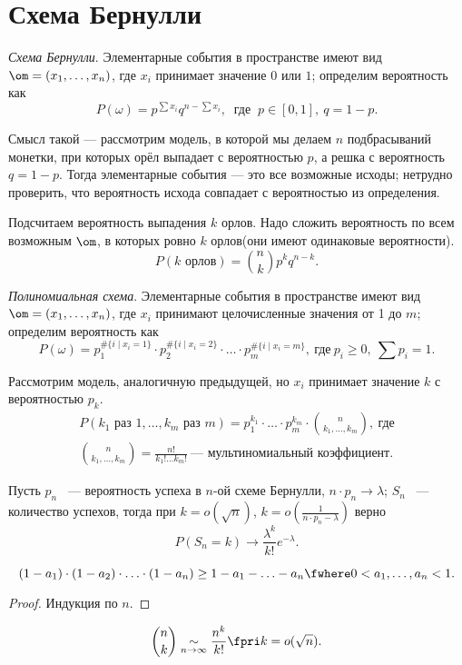 \section{Схема Бернулли}

 \begin{definition} \textit{Схема Бернулли}. Элементарные события в пространстве имеют вид $\om = (x_1, \ldots, x_n)$, где $x_i$ принимает значение $0$ или $1$; определим вероятность как
 $$P(\omega) = p^{\sum x_i}q^{n - \sum x_i},\ \text{ где } \ p \in [0, 1], \ q = 1-p.$$ 
 \end{definition}

Смысл такой --- рассмотрим модель, в которой мы делаем $n$ подбрасываний монетки, при которых орёл выпадает с вероятностью $p$, а решка с вероятность $q=1-p$. Тогда элементарные события --- это все возможные исходы; нетрудно проверить, что вероятность исхода совпадает с вероятностью из определения. 

Подсчитаем вероятность выпадения $k$ орлов. Надо сложить вероятность по всем возможным $\om$, в которых ровно $k$ орлов(они имеют одинаковые вероятности).
$$P(k \text{ орлов}) = \binom{n}{k}p^kq^{n - k}.$$

 \begin{definition}\textit{Полиномиальная схема}.
Элементарные события в пространстве имеют вид $\om = (x_1, \ldots, x_n)$, где $x_i$ принимают целочисленные значения от 1 до $m$; определим вероятность как
$$P(\omega) = p_1^{\#\{i\mid x_i = 1\}}\cdot p_2^{\#\{i\mid x_i = 2\}}\cdot\ldots\cdot p_m^{\#\{i\mid x_i = m\}},\ \text{где} \ p_i \ge 0, \ \sum p_i = 1.$$
 \end{definition}
Рассмотрим модель, аналогичную предыдущей, но $x_i$ принимает значение $k$ с вероятностью $p_k$.
\begin{gather*}
    P(k_1 \text{ раз } 1, \ldots, k_m \text{ раз } m) = p_1^{k_1}\cdot\ldots\cdot p_m^{k_m}\cdot \binom{n}{k_1,\ldots, k_m}, \ \text{где} \\ \binom{n}{k_1,\ldots, k_m} = \frac{n!}{k_1!\ldots k_m!} \ \text{--- мультиномиальный коэффициент.}
\end{gather*}

 \begin{theorem}[Пуассона]\label{th:puas}
     Пусть $p_n$ ~--- вероятность успеха в $n$-ой схеме Бернулли, $n\cdot p_n \rightarrow \lambda$;
     $S_n$ ~--- количество успехов, тогда при $k = o(\sqrt{n})$, $k = o(\frac{1}{n\cdot p_n - \lambda})$ верно
     $$P(S_n = k) \rightarrow \frac{\lambda^k}{k!}e^{-\lambda}.$$
 \end{theorem}
 \begin{lemma}
         $$(1-a_1)\cdot(1-a_2)\cdot\ldots\cdot (1-a_n) \ge 1 - a_1 - \ldots - a_n \fwhere 0 < a_1, \ldots, a_n < 1.$$
     \end{lemma}
     \begin{proof}
         Индукция по $n$.
     \end{proof}
 \begin{corollary}
         $$\binom{n}{k} \underset{n\rightarrow\infty}{\sim} \frac{n^k}{k!}\fpri k = o(\sqrt{n}).$$
     \end{corollary}
    
